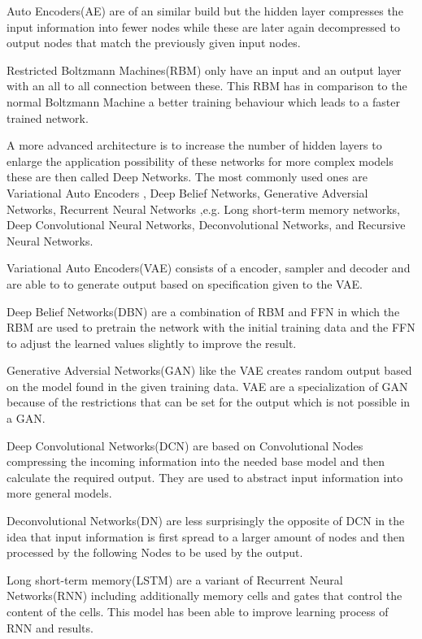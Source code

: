 \documentclass[conference]{IEEEtran}
\begin{document}
Auto Encoders(AE) are of an similar build but the hidden layer compresses the input information into fewer nodes while these are later again decompressed to output nodes that match the previously given input nodes.

Restricted Boltzmann Machines(RBM) only have an input and an output layer with an all to all connection between these. This RBM has in comparison to the normal Boltzmann Machine a better training behaviour which leads to a faster trained network.

A more advanced architecture is to increase the number of hidden layers to enlarge the application possibility of these networks for more complex models these are then called Deep Networks. The most commonly used ones are Variational Auto Encoders , Deep Belief Networks, Generative Adversial Networks, Recurrent Neural Networks ,e.g. Long short-term memory networks, Deep Convolutional Neural Networks, Deconvolutional Networks, and Recursive Neural Networks.

Variational Auto Encoders(VAE) consists of a encoder, sampler and decoder and are able to to generate output based on specification given to the VAE. 

Deep Belief Networks(DBN) are a combination of RBM and FFN in which the RBM are used to pretrain the network with the initial training 
data and the FFN to adjust the learned values slightly to improve the result. 

Generative Adversial Networks(GAN) like the VAE creates random output based on the model found in the given training data. VAE are a specialization of GAN because of the restrictions that can be set for the output which is not possible in a GAN.

Deep Convolutional Networks(DCN) are based on Convolutional Nodes compressing the incoming information into the needed base model and then calculate the required output.\cite{PattersonGibson17} They are used to abstract input information into more general models.

Deconvolutional Networks(DN)\cite{zeiler2014visualizing} are less surprisingly the opposite of DCN in the idea that input information is first spread to a larger amount of nodes and then processed by the following Nodes to be used by the output.

Long short-term memory(LSTM)\cite{hochreiter1997long} are a variant of Recurrent Neural Networks(RNN) including additionally memory cells and gates that control the content of the cells. This model has been able to improve learning process of RNN and results.
\end{document}

